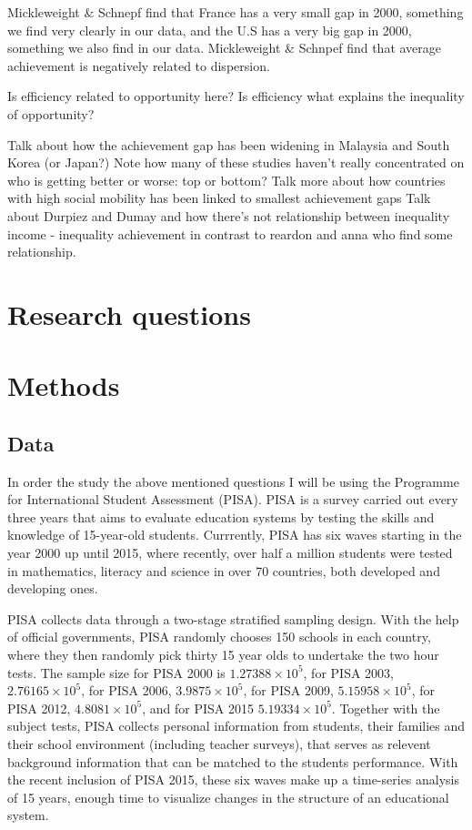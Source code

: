 \documentclass[11pt, a4paper]{article}\usepackage[]{graphicx}\usepackage[]{color}
\begin{document}
Mickleweight \& Schnepf find that France has a very small gap in 2000, something we find very clearly in our data, and the U.S has a very big gap in 2000, something we also find in our data. Mickleweight \& Schnpef find
that average achievement is negatively related to dispersion.

Is efficiency related to opportunity here? Is efficiency what explains the inequality of opportunity?

Talk about how the achievement gap has been widening in Malaysia and South Korea (or Japan?)
Note how many of these studies haven't really concentrated on who is getting better or worse: top or bottom?
Talk more about how countries with high social mobility has been linked to smallest achievement gaps
Talk about Durpiez and Dumay and how there's not relationship between inequality income - inequality achievement in contrast to reardon and anna who find some relationship.

\section{Research questions}

\section{Methods}

\subsection{Data}



In order the study the above mentioned questions I will be using the Programme for International Student Assessment (PISA). PISA is a survey carried out every three years that aims to evaluate education systems by testing the skills and knowledge of 15-year-old students. Currrently, PISA has six waves starting in the year 2000 up until 2015, where recently, over half a million students were tested in mathematics, literacy and science in over 70 countries, both developed and developing ones.

PISA collects data through a two-stage stratified sampling design. With the help of official governments, PISA randomly chooses 150 schools in each country, where they then randomly pick thirty 15 year olds to undertake the two hour tests. The sample size for PISA 2000 is \ensuremath{1.27388\times 10^{5}}, for PISA 2003, \ensuremath{2.76165\times 10^{5}}, for PISA 2006, \ensuremath{3.9875\times 10^{5}}, for PISA 2009, \ensuremath{5.15958\times 10^{5}}, for PISA 2012, \ensuremath{4.8081\times 10^{5}}, and for PISA 2015 \ensuremath{5.19334\times 10^{5}}. Together with the subject tests, PISA collects personal information from students, their families and their school environment (including teacher surveys), that serves as relevent background information that can be matched to the students performance. With the recent inclusion of PISA 2015, these six waves make up a time-series analysis of 15 years, enough time to visualize changes in the structure of an educational system.
\end{document}

